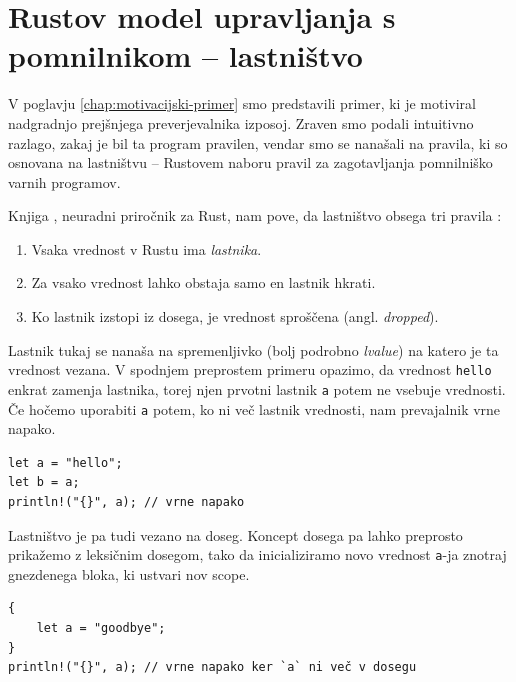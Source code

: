 \documentclass[a4paper,12pt,openright]{book}
\newcommand{\angl}[1]{(angl. \textit{#1})}
\begin{document}
\chapter{Rustov model upravljanja s pomnilnikom -- lastništvo}

V poglavju \ref{chap:motivacijski-primer} smo predstavili primer, ki je motiviral nadgradnjo prejšnjega preverjevalnika izposoj. Zraven smo podali intuitivno razlago, zakaj je bil ta program pravilen, vendar smo se nanašali na pravila, ki so osnovana na lastništvu -- Rustovem naboru pravil za zagotavljanja pomnilniško varnih programov.

Knjiga , neuradni priročnik za Rust, nam pove, da lastništvo obsega tri pravila \cite{klabnikRustProgrammingLanguage2023}:

\begin{enumerate}
	\item Vsaka vrednost v Rustu ima \textit{lastnika}.
	\item Za vsako vrednost lahko obstaja samo en lastnik hkrati.
	\item Ko lastnik izstopi iz dosega, je vrednost sproščena \angl{dropped}.
\end{enumerate}

Lastnik tukaj se nanaša na spremenljivko (bolj podrobno \textit{lvalue}) na katero je ta vrednost vezana. V spodnjem preprostem primeru opazimo, da vrednost \verb|hello| enkrat zamenja lastnika, torej njen prvotni lastnik \verb|a| potem ne vsebuje vrednosti. Če hočemo uporabiti \verb|a| potem, ko ni več lastnik vrednosti, nam prevajalnik vrne napako.

\begin{listing}[!ht]
	\begin{verbatim}
let a = "hello";
let b = a;
println!("{}", a); // vrne napako
\end{verbatim}
	\caption{Primer lastništva}
	\label{listing:ownership1}
\end{listing}

Lastništvo je pa tudi vezano na doseg. Koncept dosega pa lahko preprosto prikažemo z leksičnim dosegom, tako da inicializiramo novo vrednost \verb|a|-ja znotraj gnezdenega bloka, ki ustvari nov scope.

\begin{listing}[!ht]
	\begin{verbatim}
{
    let a = "goodbye";
}
println!("{}", a); // vrne napako ker `a` ni več v dosegu
\end{verbatim}
	\caption{Primer leksičnega dosega}
	\label{listing:scope1}
\end{listing}
\end{document}
